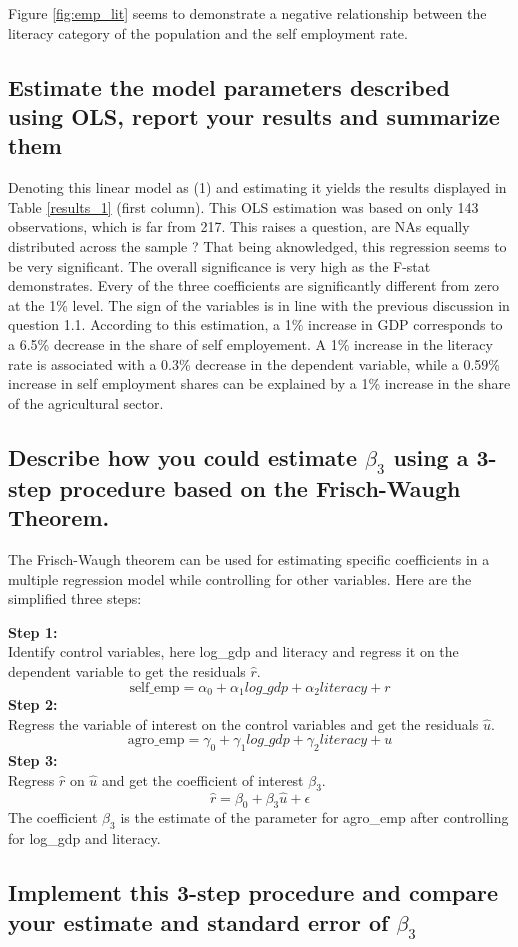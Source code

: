Figure \ref{fig:emp_lit} seems to demonstrate a negative relationship between the literacy category of the population and the self employment rate.

\subsection{Estimate the model parameters described using OLS, report your results and summarize them}

Denoting this linear model as (1) and estimating it yields the results displayed in Table \ref{results_1} (first column).
This OLS estimation was based on only 143 observations, which is far from 217. This raises a
question, are NAs equally distributed across the sample ? That being aknowledged, this regression seems
to be very significant. The overall significance is very high as the F-stat demonstrates.
Every of the three coefficients are significantly different from zero at the 1\% level.
The sign of the variables is in line with the previous discussion in question 1.1.
According to this estimation, a 1\% increase in GDP corresponds to a 6.5\% decrease in the share of self employement.
A 1\% increase in the literacy rate is associated with a 0.3\% decrease in the dependent variable, while a 0.59\% increase in self employment shares 
can be explained by a 1\% increase in the share of the agricultural sector.

\subsection{Describe how you could estimate $\beta_3$ using a 3-step procedure based on the Frisch-Waugh Theorem.}
The Frisch-Waugh theorem can be used for estimating specific coefficients in a multiple regression model while controlling for other variables. Here are the simplified three steps:


\textbf{Step 1:}\\
Identify control variables, here log\_gdp and literacy and regress it on the dependent variable to get the residuals $\hat{r}$.
\begin{equation*}
  \text{self\_emp} = \alpha_0 + \alpha_1 log\_gdp + \alpha_2 literacy + r 
\end{equation*}
\textbf{Step 2:}\\
Regress the variable of interest on the control variables and get the residuals $\hat{u}$.
\begin{equation*}
  \text{agro\_emp} = \gamma_0 + \gamma_1 log\_gdp + \gamma_2 literacy + u 
\end{equation*}
\textbf{Step 3:}\\
Regress $\hat{r}$ on $\hat{u}$ and get the coefficient of interest $\beta_3$.
\begin{equation*}
  \hat{r} = \beta_0 + \beta_3 \hat{u} + \epsilon
\end{equation*}
The coefficient $\beta_3$ is the estimate of the parameter for agro\_emp after controlling for log\_gdp and literacy.

\subsection{Implement this 3-step procedure and compare your estimate and standard error of $\beta_3$}